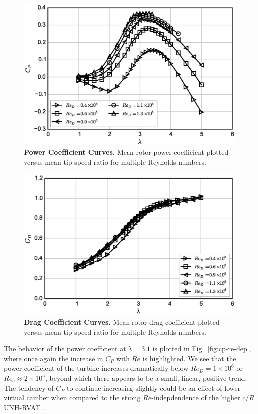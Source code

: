 \documentclass[10pt,letterpaper]{article}
\begin{document}
\begin{figure}[h]
\includegraphics[width=\textwidth]{figures/cp_curves}
\caption{{\bf Power Coefficient Curves.}
Mean rotor power coefficient plotted versus mean tip speed ratio for multiple
Reynolds numbers.}
\label{fig:cp-curves}
\end{figure}

\begin{figure}[h]
\includegraphics[width=\textwidth]{figures/cd_curves}
\caption{{\bf Drag Coefficient Curves.}
Mean rotor drag coefficient plotted versus mean tip speed ratio for multiple
Reynolds numbers.}
\label{fig:cd-curves}
\end{figure}


The behavior of the power coefficient at $\lambda=3.1$ is plotted in
Fig.~\ref{fig:cp-re-dep}, where once again the increase in $C_P$ with $Re$ is
highlighted. We see that the power coefficient of the turbine increases
dramatically below $Re_D = 1 \times 10^6$ or $Re_c \approx 2 \times 10^5$,
beyond which there appears to be a small, linear, positive trend. The tendency
of $C_P$ to continue increasing slightly could be an effect of lower virtual
camber when compared to the strong $Re$-indepdendence of the higher $c/R$
UNH-RVAT \cite{Bachant2015-RVAT-Re-dep}.
\end{document}
